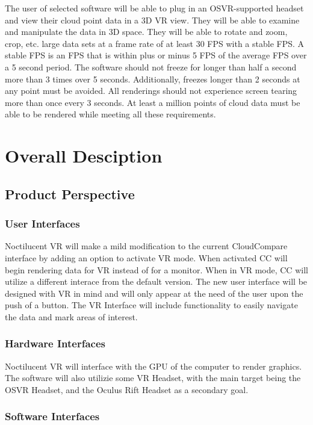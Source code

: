 \documentclass{article}
\begin{document}
The user of selected software will be able to plug in an OSVR-supported headset and view their cloud point data in a 3D VR view.
They will be able to examine and manipulate the data in 3D space. 
They will be able to rotate and zoom, crop, etc. large data sets at a frame rate of at least 30 FPS with a stable FPS.
A stable FPS is an FPS that is within plus or minus 5 FPS of the average FPS over a 5 second period.
The software should not freeze for longer than half a second more than 3 times over 5 seconds.
Additionally, freezes longer than 2 seconds at any point must be avoided.
All renderings should not experience screen tearing more than once every 3 seconds.
At least a million points of cloud data must be able to be rendered while meeting all these requirements.


\section{Overall Desciption}
\subsection{Product Perspective}

\subsubsection{User Interfaces}

Noctilucent VR will make a mild modification to the current CloudCompare interface by adding an option to activate VR mode. 
When activated CC will begin rendering data for VR instead of for a monitor.
When in VR mode, CC will utilize a different interace from the default version.
The new user interface will be designed with VR in mind and will only appear at the need of the user upon the push of a button.
The VR Interface will include functionality to easily navigate the data and mark areas of interest.

\subsubsection{Hardware Interfaces}

Noctilucent VR will interface with the GPU of the computer to render graphics.
The software will also utilizie some VR Headset, with the main target being the
OSVR Headset, and the Oculus Rift Headset as a secondary goal.

\subsubsection{Software Interfaces}
\end{document}
